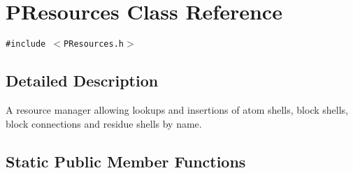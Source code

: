 \section{PResources Class Reference}
\label{classPResources}
{\tt \#include $<$PResources.h$>$}



\subsection{Detailed Description}
A resource manager allowing lookups and insertions of atom shells, block shells, block connections and residue shells by name. 

\subsection*{Static Public Member Functions}
